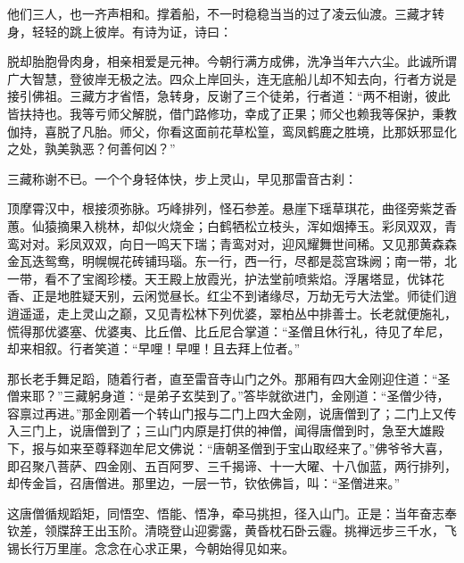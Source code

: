 \documentclass[12pt,UTF8]{ctexbook}
\begin{document}
{	他们三人，也一齐声相和。撑着船，不一时稳稳当当的过了凌云仙渡。三藏才转身，轻轻的跳上彼岸。有诗为证，诗曰：
	
	脱却胎胞骨肉身，相亲相爱是元神。今朝行满方成佛，洗净当年六六尘。此诚所谓广大智慧，登彼岸无极之法。四众上岸回头，连无底船儿却不知去向，行者方说是接引佛祖。三藏方才省悟，急转身，反谢了三个徒弟，行者道：“两不相谢，彼此皆扶持也。我等亏师父解脱，借门路修功，幸成了正果；师父也赖我等保护，秉教伽持，喜脱了凡胎。师父，你看这面前花草松篁，鸾凤鹤鹿之胜境，比那妖邪显化之处，孰美孰恶？何善何凶？”
	
	三藏称谢不已。一个个身轻体快，步上灵山，早见那雷音古刹：
	
	顶摩霄汉中，根接须弥脉。巧峰排列，怪石参差。悬崖下瑶草琪花，曲径旁紫芝香蕙。仙猿摘果入桃林，却似火烧金；白鹤牺松立枝头，浑如烟捧玉。彩凤双双，青鸾对对。彩凤双双，向日一鸣天下瑞；青鸾对对，迎风耀舞世间稀。又见那黄森森金瓦迭鸳鸯，明幌幌花砖铺玛瑙。东一行，西一行，尽都是蕊宫珠阙；南一带，北一带，看不了宝阁珍楼。天王殿上放霞光，护法堂前喷紫焰。浮屠塔显，优钵花香、正是地胜疑天别，云闲觉昼长。红尘不到诸缘尽，万劫无亏大法堂。师徒们逍逍遥遥，走上灵山之巅，又见青松林下列优婆，翠柏丛中排善士。长老就便施礼，慌得那优婆塞、优婆夷、比丘僧、比丘尼合掌道：“圣僧且休行礼，待见了牟尼，却来相叙。行者笑道：“早哩！早哩！且去拜上位者。”
	
	那长老手舞足蹈，随着行者，直至雷音寺山门之外。那厢有四大金刚迎住道：“圣僧来耶？”三藏躬身道：“是弟子玄奘到了。”答毕就欲进门，金刚道：“圣僧少待，容禀过再进。”那金刚着一个转山门报与二门上四大金刚，说唐僧到了；二门上又传入三门上，说唐僧到了；三山门内原是打供的神僧，闻得唐僧到时，急至大雄殿下，报与如来至尊释迦牟尼文佛说：“唐朝圣僧到于宝山取经来了。”佛爷爷大喜，即召聚八菩萨、四金刚、五百阿罗、三千揭谛、十一大曜、十八伽蓝，两行排列，却传金旨，召唐僧进。那里边，一层一节，钦依佛旨，叫：“圣僧进来。”
	
	这唐僧循规蹈矩，同悟空、悟能、悟净，牵马挑担，径入山门。正是：当年奋志奉钦差，领牒辞王出玉阶。清晓登山迎雾露，黄昏枕石卧云霾。挑禅远步三千水，飞锡长行万里崖。念念在心求正果，今朝始得见如来。
	
}
\end{document}
